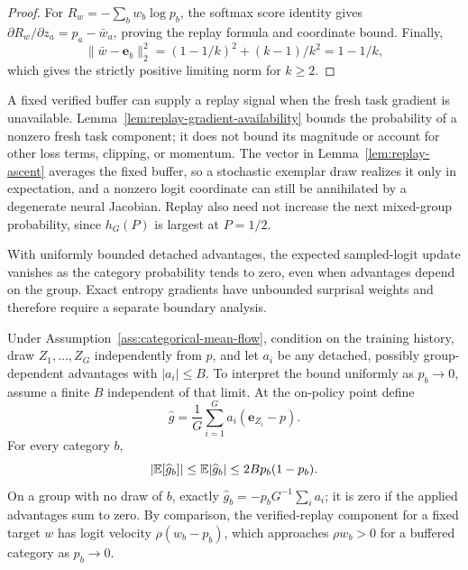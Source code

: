 \begin{proof}
\enforcehalffinalproseline
For $R_w=-\sum_b w_b\log p_b$, the softmax score identity gives
$\partial R_w/\partial z_a=p_a-\bar w_a$, proving the replay formula and
coordinate bound. Finally,
\[
 \|\bar w-\mathbf e_b\|_2^2=(1-1/k)^2+(k-1)/k^2=1-1/k,
\]
which gives the strictly positive limiting norm for $k\ge2$.
\end{proof}

\begin{remark}
A fixed verified buffer can supply a replay signal when the fresh task
gradient is unavailable. Lemma~\ref{lem:replay-gradient-availability}
bounds the probability of a nonzero fresh task component; it does not bound
its magnitude or account for other loss terms, clipping, or momentum. The vector in
Lemma~\ref{lem:replay-ascent} averages the fixed buffer, so a stochastic
exemplar draw realizes it only in expectation, and a nonzero logit coordinate
can still be annihilated by a degenerate neural Jacobian. Replay also need not
increase the next mixed-group probability, since $h_G(P)$ is largest at
$P=1/2$.
\end{remark}

With uniformly bounded detached advantages, the expected sampled-logit
update vanishes as the category probability tends to zero, even when
advantages depend on the group. Exact entropy gradients have unbounded
surprisal weights and therefore require a separate boundary analysis.

\begin{lemma}
\enforcehalffinalproseline
\label{lem:sampled-score-bound}
Under Assumption~\ref{ass:categorical-mean-flow}, condition on the training history, draw
$Z_1,\ldots,Z_G$ independently from $p$, and let $a_i$ be any detached,
possibly group-dependent advantages with $|a_i|\le B$. To interpret the
bound uniformly as $p_b\to0$, assume a finite $B$ independent of that limit.
At the on-policy point define
\[
 \widehat g=\frac1G\sum_{i=1}^G a_i(\mathbf e_{Z_i}-p).
\]
For every category $b$,
\[
 |\mathbb E[\widehat g_b]|\le\mathbb E|\widehat g_b|
 \le 2B p_b(1-p_b).
\]
On a group with no draw of $b$, exactly
$\widehat g_b=-p_bG^{-1}\sum_i a_i$; it is zero if the applied advantages
sum to zero. By comparison, the verified-replay component for a fixed target
$w$ has logit velocity $\rho(w_b-p_b)$, which approaches $\rho w_b>0$
for a buffered category as $p_b\to0$.
\end{lemma}

